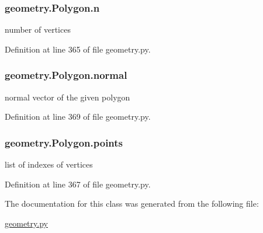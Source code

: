 \subsubsection[{\texorpdfstring{n}{n}}]{\setlength{\rightskip}{0pt plus 5cm}geometry.\+Polygon.\+n}\hypertarget{classgeometry_1_1Polygon_a4491c008a2f035119ca3f56d38afd0cf}{}\label{classgeometry_1_1Polygon_a4491c008a2f035119ca3f56d38afd0cf}


number of vertices 



Definition at line 365 of file geometry.\+py.

\subsubsection[{\texorpdfstring{normal}{normal}}]{\setlength{\rightskip}{0pt plus 5cm}geometry.\+Polygon.\+normal}\hypertarget{classgeometry_1_1Polygon_a904adb19928f3de57ee46d4410c527e3}{}\label{classgeometry_1_1Polygon_a904adb19928f3de57ee46d4410c527e3}


normal vector of the given polygon 



Definition at line 369 of file geometry.\+py.

\subsubsection[{\texorpdfstring{points}{points}}]{\setlength{\rightskip}{0pt plus 5cm}geometry.\+Polygon.\+points}\hypertarget{classgeometry_1_1Polygon_aa0fda1ff74a09b8498bd7d8731b2fbf1}{}\label{classgeometry_1_1Polygon_aa0fda1ff74a09b8498bd7d8731b2fbf1}


list of indexes of vertices 



Definition at line 367 of file geometry.\+py.



The documentation for this class was generated from the following file\+:\begin{DoxyCompactItemize}
\item 
\hyperlink{geometry_8py}{geometry.\+py}\end{DoxyCompactItemize}

